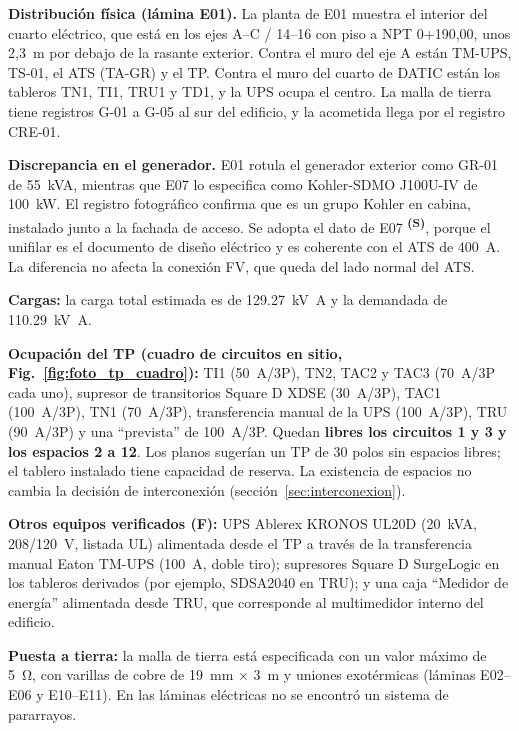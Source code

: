 \documentclass[12pt]{article}
\newcommand{\supuesto}{\textsuperscript{\textcolor{orange!80!black}{\textbf{(S)}}}}
\begin{document}
\textbf{Distribución física (lámina E01).} La planta de E01 muestra el interior del cuarto eléctrico, que está en los ejes A--C / 14--16 con piso a NPT 0+190,00, unos 2,3~m por debajo de la rasante exterior. Contra el muro del eje A están TM-UPS, TS-01, el ATS (TA-GR) y el TP. Contra el muro del cuarto de DATIC están los tableros TN1, TI1, TRU1 y TD1, y la UPS ocupa el centro. La malla de tierra tiene registros G-01 a G-05 al sur del edificio, y la acometida llega por el registro CRE-01.

\textbf{Discrepancia en el generador.} E01 rotula el generador exterior como GR-01 de 55~kVA, mientras que E07 lo especifica como Kohler-SDMO J100U-IV de 100~kW. El registro fotográfico confirma que es un grupo Kohler en cabina, instalado junto a la fachada de acceso. Se adopta el dato de E07 \supuesto{}, porque el unifilar es el documento de diseño eléctrico y es coherente con el ATS de 400~A. La diferencia no afecta la conexión FV, que queda del lado normal del ATS.

\textbf{Cargas:} la carga total estimada es de \SI{129.27}{\kilo\volt\ampere} y la demandada de \SI{110.29}{\kilo\volt\ampere}.

\textbf{Ocupación del TP (cuadro de circuitos en sitio, Fig.~\ref{fig:foto_tp_cuadro}):} TI1 (50~A/3P), TN2, TAC2 y TAC3 (70~A/3P cada uno), supresor de transitorios Square D XDSE (30~A/3P), TAC1 (100~A/3P), TN1 (70~A/3P), transferencia manual de la UPS (100~A/3P), TRU (90~A/3P) y una ``prevista'' de 100~A/3P. Quedan \textbf{libres los circuitos 1 y 3 y los espacios 2 a 12}. Los planos sugerían un TP de 30 polos sin espacios libres; el tablero instalado tiene capacidad de reserva. La existencia de espacios no cambia la decisión de interconexión (sección~\ref{sec:interconexion}).

\textbf{Otros equipos verificados (F):} UPS Ablerex KRONOS UL20D (20~kVA, 208/120~V, listada UL) alimentada desde el TP a través de la transferencia manual Eaton TM-UPS (100~A, doble tiro); supresores Square D SurgeLogic en los tableros derivados (por ejemplo, SDSA2040 en TRU); y una caja ``Medidor de energía'' alimentada desde TRU, que corresponde al multimedidor interno del edificio.

\textbf{Puesta a tierra:} la malla de tierra está especificada con un valor máximo de \SI{5}{\ohm}, con varillas de cobre de 19~mm $\times$ 3~m y uniones exotérmicas (láminas E02--E06 y E10--E11). En las láminas eléctricas no se encontró un sistema de pararrayos.
\end{document}
